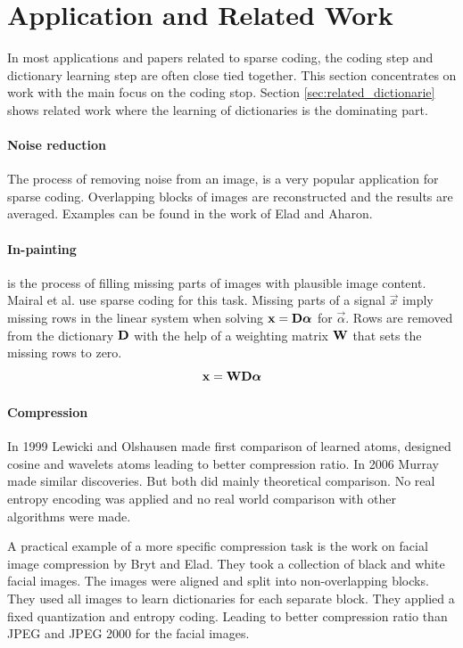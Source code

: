 \section{Application and Related Work}
\label{sec:sparse_related}
In most applications and papers related to sparse coding, the coding
step and dictionary learning step are often close tied together. This
section concentrates on work with the main focus on the coding stop. Section
\ref{sec:related_dictionarie} shows related work where the learning of
dictionaries is the dominating part.

\paragraph{Noise reduction} The process of removing noise from an image, is a
very popular application for sparse coding. Overlapping blocks of images are
reconstructed and the results are averaged. Examples can be found in the work of
Elad and Aharon\cite{Elad2006}.

\paragraph{In-painting} is the process of filling missing parts of images with
plausible image content. Mairal et al.\cite{mairal08sparse} use sparse coding
for this task. Missing parts of a signal $\vec{x}$ imply missing rows in the
linear system when solving $\boldsymbol{\mathrm{x}} = \boldsymbol{\mathrm{D}}\boldsymbol{\mathrm{\alpha}}$ for $\vec{\alpha}$.
Rows are removed from the dictionary $\boldsymbol{\mathrm{D}}$ with the help of a weighting
matrix $\boldsymbol{\mathrm{W}}$ that sets the missing rows to zero.
\begin{equation*}
\boldsymbol{\mathrm{x}} = \boldsymbol{\mathrm{W}}\boldsymbol{\mathrm{D}}\boldsymbol{\mathrm{\alpha}}\\
\end{equation*}

\paragraph{Compression} In 1999 Lewicki and Olshausen\cite{Lewicki1999} made
first comparison of learned atoms, designed cosine and wavelets atoms
leading to better compression ratio. In 2006 Murray\cite{Murray2006} made
similar discoveries. But both did mainly theoretical comparison. No real
entropy encoding was applied and no real world comparison with other
algorithms were made.

A practical example of a more specific compression task is the work on
facial image compression by Bryt and Elad\cite{Bryt2008}. They took a
collection of black and white facial images. The images were aligned and
split into non-overlapping blocks. They used all images to learn
dictionaries for each separate block. They applied a fixed quantization and
entropy coding. Leading to better compression ratio than JPEG and JPEG 2000 for
the facial images.

